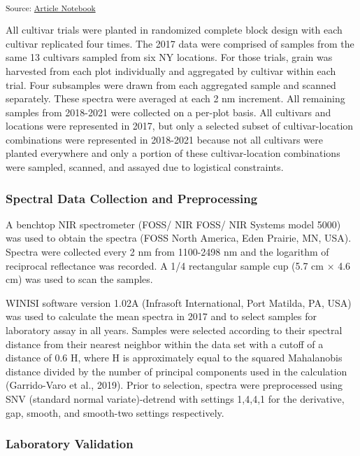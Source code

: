 \documentclass[
]{agujournal2019}
\begin{document}
\begin{longtable}[]{@{}lrrrrrr@{}}
\end{longtable}

\textsubscript{Source:
\href{https://rvcrawford.github.io/glowing-system/index.qmd.html}{Article
Notebook}}

All cultivar trials were planted in randomized complete block design
with each cultivar replicated four times. The 2017 data were comprised
of samples from the same 13 cultivars sampled from six NY locations. For
those trials, grain was harvested from each plot individually and
aggregated by cultivar within each trial. Four subsamples were drawn
from each aggregated sample and scanned separately. These spectra were
averaged at each 2 nm increment. All remaining samples from 2018-2021
were collected on a per-plot basis. All cultivars and locations were
represented in 2017, but only a selected subset of cultivar-location
combinations were represented in 2018-2021 because not all cultivars
were planted everywhere and only a portion of these cultivar-location
combinations were sampled, scanned, and assayed due to logistical
constraints.

\subsubsection{Spectral Data Collection and
Preprocessing}\label{spectral-data-collection-and-preprocessing}

A benchtop NIR spectrometer (FOSS/ NIR FOSS/ NIR Systems model 5000) was
used to obtain the spectra (FOSS North America, Eden Prairie, MN, USA).
Spectra were collected every 2 nm from 1100-2498 nm and the logarithm of
reciprocal reflectance was recorded. A 1/4 rectangular sample cup (5.7
cm × 4.6 cm) was used to scan the samples.

WINISI software version 1.02A (Infrasoft International, Port Matilda,
PA, USA) was used to calculate the mean spectra in 2017 and to select
samples for laboratory assay in all years. Samples were selected
according to their spectral distance from their nearest neighbor within
the data set with a cutoff of a distance of 0.6 H, where H is
approximately equal to the squared Mahalanobis distance divided by the
number of principal components used in the calculation (Garrido-Varo et
al., 2019). Prior to selection, spectra were preprocessed using SNV
(standard normal variate)-detrend with settings 1,4,4,1 for the
derivative, gap, smooth, and smooth-two settings respectively.

\subsubsection{Laboratory Validation}\label{laboratory-validation}
\end{document}
